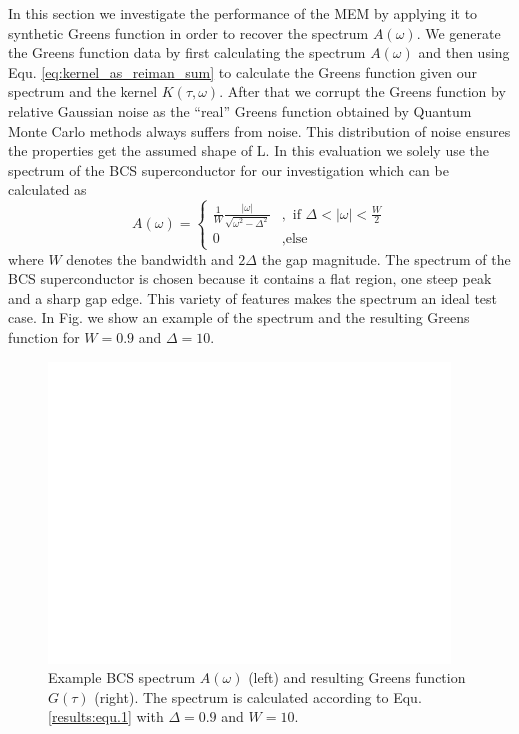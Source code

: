 In this section we investigate the performance of the MEM by applying it to synthetic Greens function in order to recover the spectrum $A(\omega)$. We generate the Greens function data by first calculating the spectrum $A(\omega)$ and then using Equ. \ref{eq:kernel_as_reiman_sum} to calculate the Greens function given our spectrum and the kernel $K(\tau,\omega)$. After that we corrupt the Greens function by relative Gaussian noise as the ``real'' Greens function obtained by Quantum Monte Carlo methods always suffers from noise. This distribution of noise ensures the properties get the assumed shape of L. In this evaluation we solely use the spectrum of the BCS superconductor for our investigation which can be calculated as
\begin{equation}
	A(\omega) = 
		\begin{cases}
			\frac{1}{W} \frac{|\omega|}{\sqrt{\omega^2 - \Delta^2}}&, \text{ if } \Delta < |\omega| < \frac{W}{2} \\
			0 &, \text{else}
		\end{cases}
	\label{results:equ.1}
\end{equation}
where $W$ denotes the bandwidth and $2\Delta$ the gap magnitude. The spectrum of the BCS superconductor is chosen because it contains a flat region, one steep peak and a sharp gap edge. This variety of features makes the spectrum an ideal test case.
In Fig. we show an example of the spectrum and the resulting Greens function for $W = 0.9$ and $\Delta = 10$.
\begin{figure}[htbp]
	\centering
	\includegraphics[width=0.95\textwidth]{./images/BCS_A_G_example.pdf}
	\caption{Example BCS spectrum $A(\omega)$ (left) and resulting Greens function $G(\tau)$ (right). The spectrum is calculated according to Equ. \ref{results:equ.1} with $\Delta = 0.9$ and $W = 10$.}
	\label{results:fig.1}
\end{figure}
\FloatBarrier
